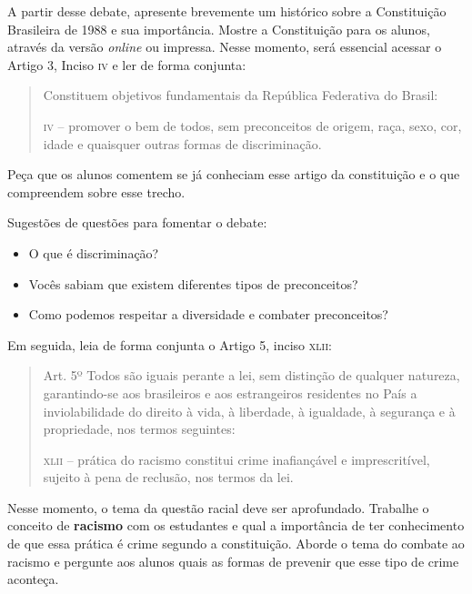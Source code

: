 \documentclass[11pt]{extarticle}
\begin{document}
A partir desse debate, apresente brevemente um histórico sobre a Constituição Brasileira de 1988 e sua importância. Mostre a Constituição para os alunos, através da versão \textit{online} ou impressa. Nesse momento, será essencial acessar o Artigo 3, Inciso \textsc{iv} e ler de forma conjunta: 

\begin{quote}Constituem objetivos fundamentais da República Federativa do Brasil:

\textsc{iv} -- promover o bem de todos, sem preconceitos de origem, raça, sexo, cor, idade e quaisquer outras formas de discriminação.\end{quote}

Peça que os alunos comentem se já conheciam esse artigo da constituição e o que compreendem sobre esse trecho. 

Sugestões de questões para fomentar o debate:

\begin{itemize}

\item O que é discriminação?

\item Vocês sabiam que existem diferentes tipos de preconceitos?

\item Como podemos respeitar a diversidade e combater preconceitos?

\end{itemize}

Em seguida, leia de forma conjunta o Artigo 5, inciso \textsc{xlii}:

\begin{quote}Art. 5º Todos são iguais perante a lei, sem distinção de qualquer natureza, garantindo-se aos brasileiros e aos estrangeiros residentes no País a inviolabilidade do direito à vida, à liberdade, à igualdade, à segurança e à propriedade, nos termos seguintes:

\textsc{xlii} -- prática do racismo constitui crime inafiançável e imprescritível, sujeito à pena de reclusão, nos termos da lei.\end{quote}

Nesse momento, o tema da questão racial deve ser aprofundado. Trabalhe o conceito de \textbf{racismo} com os estudantes e qual a importância de ter conhecimento de que essa prática é crime segundo a constituição. Aborde o tema do combate ao racismo e pergunte aos alunos quais as formas de prevenir que esse tipo de crime aconteça.
\end{document}
